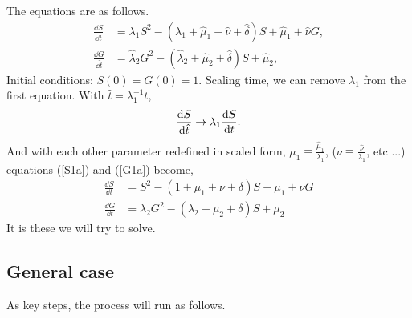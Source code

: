 The equations are as follows.
\begin{align}
\frac{\dd S}{\dd \hat t} &= \lambda_1 S^2 - (\lambda_1 + \hat\mu_1 + \hat\nu + \hat\delta) S + \hat\mu_1 + \hat\nu G,\label{S1a}\\
\frac{\dd G}{\dd \hat t} &= \hat\lambda_2 G^2 - (\hat\lambda_2 + \hat\mu_2 + \hat\delta) S + \hat \mu_2, \label{G1a}
\end{align}
Initial conditions: $S(0) = G(0) = 1$. Scaling time, we can remove $\lambda_1$ from the first equation. With $\hat t =  \lambda_1^{-1} t$, 
$$\frac{{\rm d} S}{{\rm d} \hat t} \rightarrow \lambda_1 \displaystyle\frac{{\rm d} S}{{\rm d} t}.$$
And with each other parameter redefined in scaled form, $\mu_1 \equiv \frac{\hat\mu_1}{\lambda_1}$, ($\nu \equiv \frac{\hat \nu}{\lambda_1}$, etc ...) equations (\ref{S1a}) and (\ref{G1a}) become,
\begin{align}
\frac{\dd S}{\dd  t} &= S^2 - (1 + \mu_1 + \nu + \delta) S + \mu_1 + \nu G \label{S1b}\\
\frac{\dd G}{\dd  t} &= \lambda_2 G^2 - (\lambda_2 + \mu_2 + \delta) S +  \mu_2 \label{G1bhh}
\end{align}
It is these we will try to solve. 




\subsection{General case}

As key steps, the process will run as follows. \\


